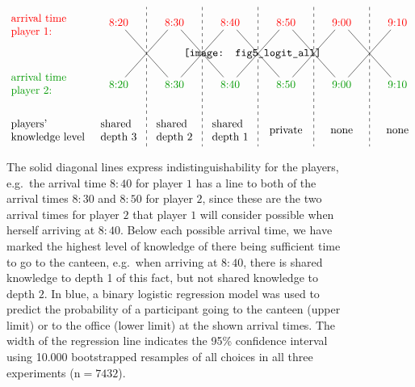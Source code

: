 \begin{figure} %
\[
  \begin{tikzpicture}[align=left,xscale=0.9]
   \node[anchor=west] at (-1.0,-2.5) {players' \\ knowledge level}; %
   \node[anchor=west,red] at (-1.0,0.9) {arrival time \\ player 1:};
   \node[anchor=west,mygreen] at (-1.0,-1) {arrival time \\ player 2:};
   \node[red] (n1820) at (3,1) {8{:}20};
   \node[mygreen] (n2820) at (3,-1) {8{:}20};
    \node[red] (n1830) at (5,1) {8{:}30};
   \node[mygreen] (n2830) at (5,-1) {8{:}30};
   \draw[-] (n1820) to (n2830);
   \draw[-] (n2820) to (n1830);
  \draw[dashed] (4,-3) to (4,1.5);
    \node[red] (n1840) at (7,1) {8{:}40};
   \node[mygreen] (n2840) at (7,-1) {8{:}40};
    \node[red] (n1850) at (9,1) {8{:}50};
   \node[mygreen] (n2850) at (9,-1) {8{:}50};
     \draw[-] (n2840) to (n1850);
   \draw[-] (n1840) to (n2850);
   \draw[-] (n1830) to (n2840);
   \draw[-] (n2830) to (n1840);
  \draw[dashed] (6,1.5) to (6,-3);
  \draw[dashed] (8,1.5) to (8,-3);
     \node[red] (n1900) at (11,1) {9{:}00};
   \node[mygreen] (n2900) at (11,-1) {9{:}00};
    \node[red] (n1910) at (13,1) {9{:}10};
   \node[mygreen] (n2910) at (13,-1) {9{:}10};
     \draw[-] (n2850) to (n1900);
   \draw[-] (n1850) to (n2900);
   \draw[-] (n1900) to (n2910);
   \draw[-] (n2900) to (n1910);
  \draw[dashed] (12,1.5) to (12,-3);
  \draw[dashed] (10,1.5) to (10,-3);
  \node at (13,-2.5) {none};
  \node at (11,-2.5) {none};
  \node at (9,-2.5) {private};
  \node at (7,-2.5) {shared\\ depth 1};
  \node at (5,-2.5) {shared\\ depth 2};
 \node at (3,-2.5) {shared\\ depth 3};
 \node at (7.8,0)
 	{\texttt{[image: fig5\_logit\_all]}};
  \end{tikzpicture}
  \]
  \caption{The solid diagonal lines express indistinguishability for the players, e.g.\ the arrival time $8{:}40$ for player $1$ has a line to both of the arrival times $8{:}30$ and $8{:}50$ for player $2$, since these are the two arrival times for player $2$ that player $1$ will consider possible when herself arriving at $8{:}40$. Below each possible arrival time, we have marked the highest level of knowledge of there being sufficient time to go to the canteen, e.g.\ when arriving at $8{:}40$, there is shared knowledge to depth 1 of this fact, but not shared knowledge to depth $2$. In blue, a binary logistic regression model was used to predict the probability of a participant going to the canteen (upper limit) or to the office (lower limit) at the shown arrival times. The width of the regression line indicates the 95\% confidence interval using 10.000 bootstrapped resamples of all choices in all three experiments ($\text{n}=7432$).
  }\label{fig:indistinguish}
\end{figure}

